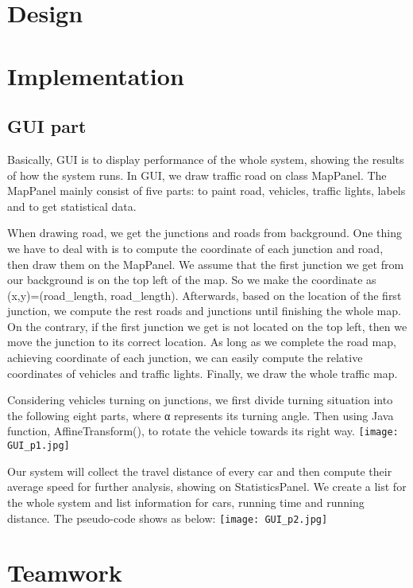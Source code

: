 \documentclass[a4paper,12pt]{article}
\begin{document}
\section{Design}

\section{Implementation}

\subsection*{GUI part}
Basically, GUI is to display performance of the whole system, showing the results of how the system runs. In GUI, we draw traffic road on class MapPanel. The MapPanel mainly consist of five parts: to paint road, vehicles, traffic lights, labels and to get statistical data.

When drawing road, we get the junctions and roads from background. One thing we have to deal with is to compute the coordinate of each junction and road, then draw them on the MapPanel. We assume that the first junction we get from our background is on the top left of the map. So we make the coordinate as (x,y)=(road_length, road_length). Afterwards, based on the location of the first junction, we compute the rest roads and junctions until finishing the whole map. On the contrary, if the first junction we get is not located on the top left, then we move the junction to its correct location. As long as we complete the road map, achieving coordinate of each junction, we can easily compute the relative coordinates of vehicles and traffic lights. Finally, we draw the whole traffic map.

Considering vehicles turning on junctions, we first divide turning situation into the following eight parts, where α represents its turning angle. Then using Java function, AffineTransform(), to rotate the vehicle towards its right way.
\texttt{[image: GUI\_p1.jpg]}

Our system will collect the travel distance of every car and then compute their average speed for further analysis, showing on StatisticsPanel. We create a list for the whole system and list information for cars, running time and running distance. The pseudo-code shows as below:
\texttt{[image: GUI\_p2.jpg]}

\section{Teamwork}
\end{document}
